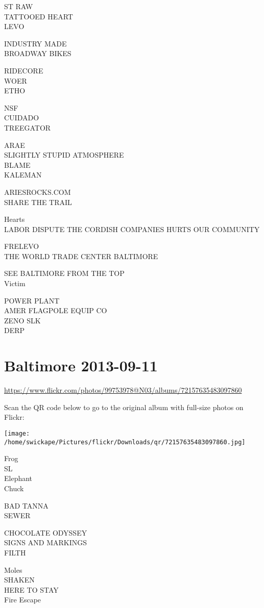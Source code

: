 \documentclass[10pt,letterpaper]{article}
\begin{document}
ST RAW\\
TATTOOED HEART\\
LEVO

INDUSTRY MADE\\
BROADWAY BIKES

RIDECORE\\
WOER\\
ETHO

NSF\\
CUIDADO\\
TREEGATOR

ARAE\\
SLIGHTLY STUPID ATMOSPHERE\\
BLAME\\
KALEMAN

ARIESROCKS.COM\\
SHARE THE TRAIL

Hearts\\
LABOR DISPUTE THE CORDISH COMPANIES HURTS OUR COMMUNITY

FRELEVO\\
THE WORLD TRADE CENTER BALTIMORE

SEE BALTIMORE FROM THE TOP\\
Victim

POWER PLANT\\
AMER FLAGPOLE EQUIP CO\\
ZENO SLK\\
DERP
\pagebreak

\section*{Baltimore 2013-09-11}

\url{https://www.flickr.com/photos/99753978@N03/albums/72157635483097860}

Scan the QR code below to go to the original album with full-size photos on Flickr:

\texttt{[image: /home/swickape/Pictures/flickr/Downloads/qr/72157635483097860.jpg]}
\pagebreak

Frog\\
SL\\
Elephant\\
Chuck

BAD TANNA\\
SEWER

CHOCOLATE ODYSSEY\\
SIGNS AND MARKINGS\\
FILTH

Moles\\
SHAKEN\\
HERE TO STAY\\
Fire Escape
\end{document}
